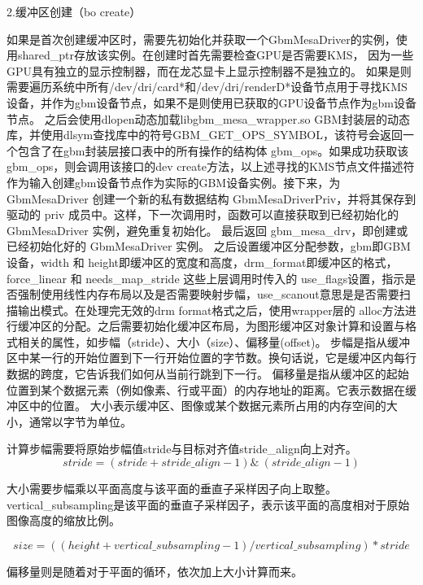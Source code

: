 2.缓冲区创建（bo create）

如果是首次创建缓冲区时，需要先初始化并获取一个GbmMesaDriver的实例，使用shared\_ptr存放该实例。在创建时首先需要检查GPU是否需要KMS，
因为一些GPU具有独立的显示控制器，而在龙芯显卡上显示控制器不是独立的。
如果是则需要遍历系统中所有/dev/dri/card*和/dev/dri/renderD*设备节点用于寻找KMS设备，并作为gbm设备节点，如果不是则使用已获取的GPU设备节点作为gbm设备节点。
之后会使用dlopen动态加载libgbm\_mesa\_wrapper.so GBM封装层的动态库，并使用dlsym查找库中的符号GBM\_GET\_OPS\_SYMBOL，该符号会返回一个包含了在gbm封装层接口表中的所有操作的结构体
gbm\_ops。如果成功获取该gbm\_ops，则会调用该接口的dev create方法，以上述寻找的KMS节点文件描述符作为输入创建gbm设备节点作为实际的GBM设备实例。接下来，为 GbmMesaDriver 
创建一个新的私有数据结构 GbmMesaDriverPriv，并将其保存到驱动的 priv 成员中。这样，下一次调用时，函数可以直接获取到已经初始化的 GbmMesaDriver 实例，避免重复初始化。
最后返回 gbm\_mesa\_drv，即创建或已经初始化好的 GbmMesaDriver 实例。
之后设置缓冲区分配参数，gbm即GBM设备，width 和 height即缓冲区的宽度和高度，drm\_format即缓冲区的格式，force\_linear 和 needs\_map\_stride
这些上层调用时传入的 use\_flags设置，指示是否强制使用线性内存布局以及是否需要映射步幅，use\_scanout意思是是否需要扫描输出模式。在处理完无效的drm format格式之后，使用wrapper层的
alloc方法进行缓冲区的分配。之后需要初始化缓冲区布局，为图形缓冲区对象计算和设置与格式相关的属性，如步幅（stride）、大小（size）、偏移量(offset)。
步幅是指从缓冲区中某一行的开始位置到下一行开始位置的字节数。换句话说，它是缓冲区内每行数据的跨度，它告诉我们如何从当前行跳到下一行。
偏移量是指从缓冲区的起始位置到某个数据元素（例如像素、行或平面）的内存地址的距离。它表示数据在缓冲区中的位置。
大小表示缓冲区、图像或某个数据元素所占用的内存空间的大小，通常以字节为单位。

计算步幅需要将原始步幅值stride与目标对齐值stride\_align向上对齐。
\begin{equation}
  stride=(stride+stride\_align-1)\&~(stride\_align-1)
\end{equation}

大小需要步幅乘以平面高度与该平面的垂直子采样因子向上取整。vertical\_subsampling是该平面的垂直子采样因子，表示该平面的高度相对于原始图像高度的缩放比例。

\begin{equation}
  size=((height+vertical\_subsampling-1)/vertical\_subsampling)*stride
\end{equation}

偏移量则是随着对于平面的循环，依次加上大小计算而来。

